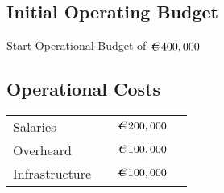 \documentclass[a4paper,12pt]{article}
\newcommand{\euro}{\kern.17em{}C\kern-.95em\raise.19ex\hbox{\it
=\/}\kern.17em{}}
\begin{document}
\subsection{Initial Operating Budget}

Start Operational Budget of $\euro 400,000$

\subsection{Operational Costs}

\begin{tabular}{lccr}
Salaries      										&	&	$\euro 200,000$ \\
Overheard      									&	&	$\euro 100,000$ \\
Infrastructure 									&	&	$\euro 100,000$
\end{tabular}
\end{document}
